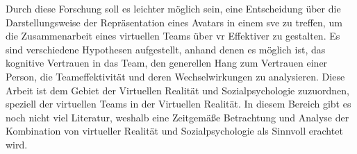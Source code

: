 \documentclass[a4paper,11pt]{article}%
\renewcommand{\\}{\vspace*{0.5\baselineskip} \newline}
\begin{document}
	Durch diese Forschung soll es leichter möglich sein, eine Entscheidung über die Darstellungsweise der Repräsentation eines Avatars in einem \ac{sve} zu treffen, um die Zusammenarbeit eines virtuellen Teams über \ac{vr} Effektiver zu gestalten.\\
	Es sind verschiedene Hypothesen aufgestellt, anhand denen es möglich ist, das kognitive Vertrauen in das Team, den generellen Hang zum Vertrauen einer Person, die Teameffektivität und deren Wechselwirkungen zu analysieren.
	Diese Arbeit ist dem Gebiet der Virtuellen Realität und Sozialpsychologie zuzuordnen, speziell der virtuellen Teams in der Virtuellen Realität.
	In diesem Bereich gibt es noch nicht viel Literatur, weshalb eine Zeitgemäße Betrachtung und Analyse der Kombination von virtueller Realität und Sozialpsychologie als Sinnvoll erachtet wird.\\

\end{document}
